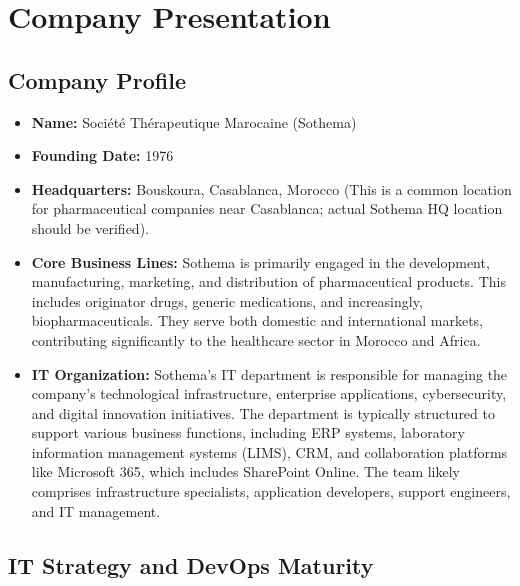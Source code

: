 \chapter{Company Presentation}
\label{chapter:CompanyPresentation}

\section{Company Profile}
\label{sec:CompanyProfile}

\begin{itemize}
    \item \textbf{Name:} Société Thérapeutique Marocaine (Sothema)
    \item \textbf{Founding Date:} 1976
    \item \textbf{Headquarters:} Bouskoura, Casablanca, Morocco (This is a common location for pharmaceutical companies near Casablanca; actual Sothema HQ location should be verified).
    \item \textbf{Core Business Lines:} Sothema is primarily engaged in the development, manufacturing, marketing, and distribution of pharmaceutical products. This includes originator drugs, generic medications, and increasingly, biopharmaceuticals. They serve both domestic and international markets, contributing significantly to the healthcare sector in Morocco and Africa.
    \item \textbf{IT Organization:} Sothema's IT department is responsible for managing the company's technological infrastructure, enterprise applications, cybersecurity, and digital innovation initiatives. The department is typically structured to support various business functions, including ERP systems, laboratory information management systems (LIMS), CRM, and collaboration platforms like Microsoft 365, which includes SharePoint Online. The team likely comprises infrastructure specialists, application developers, support engineers, and IT management.
\end{itemize}

\section{IT Strategy and DevOps Maturity}
\label{sec:ITStrategyDevOpsMaturity}

